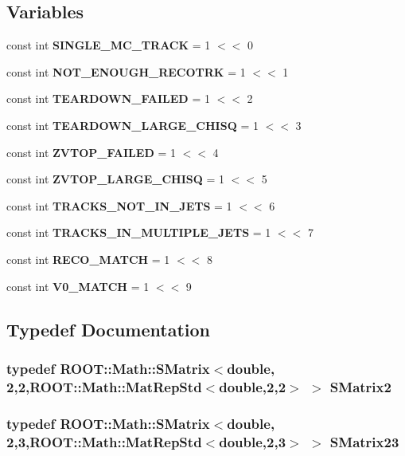 \subsection*{Variables}
\begin{DoxyCompactItemize}
\item 
const int {\bf S\-I\-N\-G\-L\-E\-\_\-\-M\-C\-\_\-\-T\-R\-A\-C\-K} = 1 $<$$<$ 0
\item 
const int {\bf N\-O\-T\-\_\-\-E\-N\-O\-U\-G\-H\-\_\-\-R\-E\-C\-O\-T\-R\-K} = 1 $<$$<$ 1
\item 
const int {\bf T\-E\-A\-R\-D\-O\-W\-N\-\_\-\-F\-A\-I\-L\-E\-D} = 1 $<$$<$ 2
\item 
const int {\bf T\-E\-A\-R\-D\-O\-W\-N\-\_\-\-L\-A\-R\-G\-E\-\_\-\-C\-H\-I\-S\-Q} = 1 $<$$<$ 3
\item 
const int {\bf Z\-V\-T\-O\-P\-\_\-\-F\-A\-I\-L\-E\-D} = 1 $<$$<$ 4
\item 
const int {\bf Z\-V\-T\-O\-P\-\_\-\-L\-A\-R\-G\-E\-\_\-\-C\-H\-I\-S\-Q} = 1 $<$$<$ 5
\item 
const int {\bf T\-R\-A\-C\-K\-S\-\_\-\-N\-O\-T\-\_\-\-I\-N\-\_\-\-J\-E\-T\-S} = 1 $<$$<$ 6
\item 
const int {\bf T\-R\-A\-C\-K\-S\-\_\-\-I\-N\-\_\-\-M\-U\-L\-T\-I\-P\-L\-E\-\_\-\-J\-E\-T\-S} = 1 $<$$<$ 7
\item 
const int {\bf R\-E\-C\-O\-\_\-\-M\-A\-T\-C\-H} = 1 $<$$<$ 8
\item 
const int {\bf V0\-\_\-\-M\-A\-T\-C\-H} = 1 $<$$<$ 9
\end{DoxyCompactItemize}


\subsection{Typedef Documentation}
\subsubsection[{S\-Matrix2}]{\setlength{\rightskip}{0pt plus 5cm}typedef R\-O\-O\-T\-::\-Math\-::\-S\-Matrix$<$double, 2,2,R\-O\-O\-T\-::\-Math\-::\-Mat\-Rep\-Std$<$double,2,2$>$ $>$ {\bf S\-Matrix2}}\label{Driver_8cc_a59c4f66f8955c2a49e2283a47a143b64}
\subsubsection[{S\-Matrix23}]{\setlength{\rightskip}{0pt plus 5cm}typedef R\-O\-O\-T\-::\-Math\-::\-S\-Matrix$<$double, 2,3,R\-O\-O\-T\-::\-Math\-::\-Mat\-Rep\-Std$<$double,2,3$>$ $>$ {\bf S\-Matrix23}}\label{Driver_8cc_a72895daca02ecd6fee17a5687bf19ae8}

